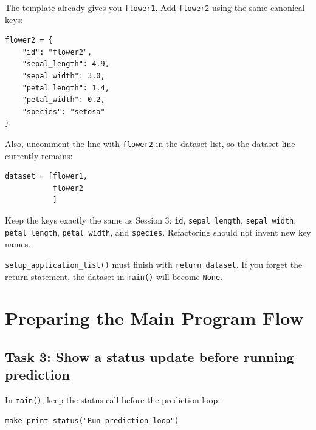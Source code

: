 The template already gives you \texttt{flower1}. Add \texttt{flower2} using the same canonical keys:

\begin{verbatim}
flower2 = {
    "id": "flower2",
    "sepal_length": 4.9,
    "sepal_width": 3.0,
    "petal_length": 1.4,
    "petal_width": 0.2,
    "species": "setosa"
}
\end{verbatim}

Also,  uncomment the line with \texttt{flower2} in the dataset list, so the dataset line currently remains:

\begin{verbatim}
dataset = [flower1,
           flower2
           ]
\end{verbatim}

\begin{tcolorbox}[title=Good Practice]
Keep the keys exactly the same as Session 3: \texttt{id}, \texttt{sepal\_length}, \texttt{sepal\_width}, \texttt{petal\_length}, \texttt{petal\_width}, and \texttt{species}. Refactoring should not invent new key names.
\end{tcolorbox}

\begin{tcolorbox}[title=Checkpoint]
\texttt{setup\_application\_list()} must finish with \texttt{return dataset}. If you forget the return statement, the dataset in \texttt{main()} will become \texttt{None}.
\end{tcolorbox}

\section{Preparing the Main Program Flow}

\subsection{Task 3: Show a status update before running prediction}

\begin{tcolorbox}[title=Task 3 : Show a status update before running prediction]
In \texttt{main()}, keep the status call before the prediction loop:
\end{tcolorbox}

\begin{verbatim}
make_print_status("Run prediction loop")
\end{verbatim}

